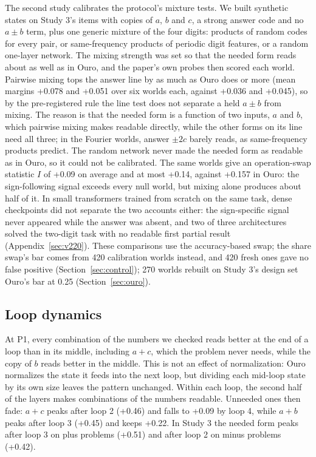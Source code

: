 \documentclass{article}
\begin{document}
The second study calibrates the protocol's mixture tests. We built synthetic states on Study 3's items with copies of $a$, $b$ and $c$, a strong answer code and no $a\pm b$ term, plus one generic mixture of the four digits: products of random codes for every pair, or same-frequency products of periodic digit features, or a random one-layer network. The mixing strength was set so that the needed form reads about as well as in Ouro, and the paper's own probes then scored each world. Pairwise mixing tops the answer line by as much as Ouro does or more (mean margins +0.078 and +0.051 over six worlds each, against +0.036 and +0.045), so by the pre-registered rule the line test does not separate a held $a\pm b$ from mixing. The reason is that the needed form is a function of two inputs, $a$ and $b$, which pairwise mixing makes readable directly, while the other forms on its line need all three; in the Fourier worlds, answer $\pm 2c$ barely reads, as same-frequency products predict. The random network never made the needed form as readable as in Ouro, so it could not be calibrated. The same worlds give an operation-swap statistic $I$ of +0.09 on average and at most +0.14, against +0.157 in Ouro: the sign-following signal exceeds every null world, but mixing alone produces about half of it. In small transformers trained from scratch on the same task, dense checkpoints did not separate the two accounts either: the sign-specific signal never appeared while the answer was absent, and two of three architectures solved the two-digit task with no readable first partial result (Appendix~\ref{sec:v220}). These comparisons use the accuracy-based swap; the share swap's bar comes from 420 calibration worlds instead, and 420 fresh ones gave no false positive (Section~\ref{sec:control}); 270 worlds rebuilt on Study 3's design set Ouro's bar at 0.25 (Section~\ref{sec:ouro}).

\subsection{Loop dynamics}\label{sec:dynamics}

At P1, every combination of the numbers we checked reads better at the end of a loop than in its middle, including $a+c$, which the problem never needs, while the copy of $b$ reads better in the middle. This is not an effect of normalization: Ouro normalizes the state it feeds into the next loop, but dividing each mid-loop state by its own size leaves the pattern unchanged. Within each loop, the second half of the layers makes combinations of the numbers readable. Unneeded ones then fade: $a+c$ peaks after loop 2 (+0.46) and falls to +0.09 by loop 4, while $a+b$ peaks after loop 3 (+0.45) and keeps +0.22. In Study 3 the needed form peaks after loop 3 on plus problems (+0.51) and after loop 2 on minus problems (+0.42).
\end{document}
